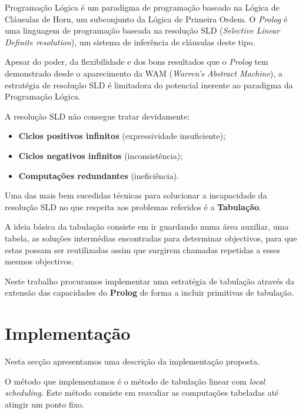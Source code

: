\documentclass[12pt,a4paper,oneside]{article}
\begin{document}
Programação Lógica é um paradigma de programação baseado na Lógica de Cláusulas de Horn, um subconjunto da Lógica de Primeira Ordem. O \textit{Prolog} é uma linguagem de programação baseada na resolução SLD (\textit{Selective Linear Definite resolution}), um sistema de inferência de cláusulas deste tipo.

Apesar do poder, da flexibilidade e dos bons resultados que o \textit{Prolog} tem demonstrado desde o aparecimento da WAM (\textit{Warren's Abstract Machine}), a estratégia de resolução SLD é limitadora do potencial inerente ao paradigma da Programação Lógica.

A resolução SLD não consegue tratar devidamente:

\begin{itemize}
	\item \textbf{Ciclos positivos infinitos} (expressividade insuficiente);
	\item \textbf{Ciclos negativos infinitos} (inconsistência);
	\item \textbf{Computações redundantes} (ineficiência).
\end{itemize}

Uma das mais bem sucedidas técnicas para solucionar a incapacidade da resolução SLD no que respeita aos problemas referidos é a \textbf{Tabulação}.

A ideia básica da tabulação consiste em ir guardando numa área auxiliar, uma tabela, as soluções intermédias encontradas para determinar objectivos, para que estas possam ser reutilizadas assim que surgirem chamadas repetidas a esses mesmos objectivos.

Neste trabalho procuramos implementar uma estratégia de tabulação através da extensão das capacidades do \textbf{Prolog} de forma a incluir primitivas de tabulação.


\section{Implementação}\label{sec:implem}

Nesta secção apresentamos uma descrição da implementação proposta.

O método que implementamos é o método de tabulação linear com \textit{local scheduling}. Este método consiste em reavaliar as computações tabeladas até atingir um ponto fixo.
\end{document}
